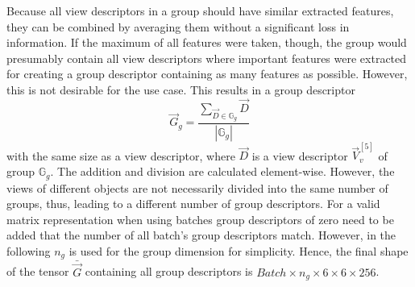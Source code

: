 Because all view descriptors in a group should have similar extracted features, they can be combined by averaging them without a significant loss in information.
If the maximum of all features were taken, though, the group would presumably contain all view descriptors where important features were extracted for creating a group descriptor containing as many features as possible.
However, this is not desirable for the use case.
This results in a group descriptor
\begin{equation}
	\vec{G}_g = \frac{\sum_{\vec{D} \in \mathbb{G}_g} \vec{D}}{|\mathbb{G}_g|}
\end{equation}
with the same size as a view descriptor, where $\vec{D}$ is a view descriptor $\vec{V}_v^{[5]}$ of group $\mathbb{G}_g$.
The addition and division are calculated element-wise.
However, the views of different objects are not necessarily divided into the same number of groups, thus, leading to a different number of group descriptors.
For a valid matrix representation when using batches group descriptors of zero need to be added that the number of all batch's group descriptors match.
However, in the following $n_g$ is used for the group dimension for simplicity.
Hence, the final shape of the tensor $\bar{\vec{G}}$ containing all group descriptors is $Batch \times n_g \times 6 \times 6 \times 256$.

